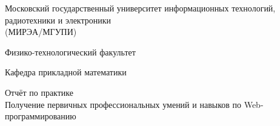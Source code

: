 \begin{titlepage}
\begin{center} %

\bfseries

	{\Large Московский государственный университет информационных технологий, радиотехники и электроники \\
	(МИРЭА/МГУПИ)
	
	} %

\vspace{48pt}


	{\large 
	  Физико-технологический факультет
	}


\vspace{36pt}


	{\large  {\comic Кафедра прикладной математики}
	
	} %

\vspace{48pt}

{\large	\DoloresCyr Отчёт по практике  \\
  \LARGE{Получение первичных профессиональных умений и навыков по Web-программированию}
	
	}

\vspace{12pt}


\end{center} %

\vspace{60pt}


\end{titlepage}

